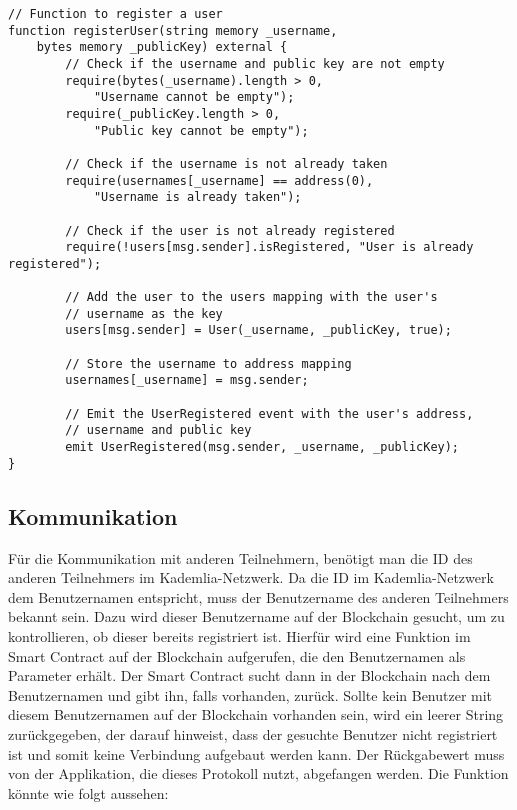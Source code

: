 \begin{lstlisting}[language=Solidity, caption={Registrierung eines Nutzers auf der Blockchain},captionpos=b]
// Function to register a user
function registerUser(string memory _username, 
    bytes memory _publicKey) external {
        // Check if the username and public key are not empty
        require(bytes(_username).length > 0, 
            "Username cannot be empty");
        require(_publicKey.length > 0, 
            "Public key cannot be empty");

        // Check if the username is not already taken
        require(usernames[_username] == address(0), 
            "Username is already taken");

        // Check if the user is not already registered
        require(!users[msg.sender].isRegistered, "User is already registered");

        // Add the user to the users mapping with the user's 
        // username as the key
        users[msg.sender] = User(_username, _publicKey, true);

        // Store the username to address mapping
        usernames[_username] = msg.sender;

        // Emit the UserRegistered event with the user's address, 
        // username and public key
        emit UserRegistered(msg.sender, _username, _publicKey);
}
\end{lstlisting}


\subsection{Kommunikation}
\label{subsec:kommunikation}
Für die Kommunikation mit anderen Teilnehmern, benötigt man die ID des anderen Teilnehmers im Kademlia-Netzwerk. Da die ID im Kademlia-Netzwerk dem Benutzernamen entspricht, muss der Benutzername des anderen Teilnehmers bekannt sein. Dazu wird dieser Benutzername auf der Blockchain gesucht, um zu kontrollieren, ob dieser bereits registriert ist. Hierfür wird eine Funktion im Smart Contract auf der Blockchain aufgerufen, die den Benutzernamen als Parameter erhält. Der Smart Contract sucht dann in der Blockchain nach dem Benutzernamen und gibt ihn, falls vorhanden, zurück. Sollte kein Benutzer mit diesem Benutzernamen auf der Blockchain vorhanden sein, wird ein leerer String zurückgegeben, der darauf hinweist, dass der gesuchte Benutzer nicht registriert ist und somit keine Verbindung aufgebaut werden kann. Der Rückgabewert muss von der Applikation, die dieses Protokoll nutzt, abgefangen werden. 
Die Funktion könnte wie folgt aussehen:

